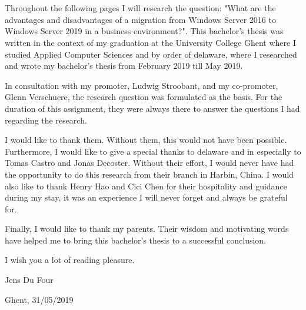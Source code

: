 
\chapter*{}
\label{ch:voorwoord}

Throughout the following pages I will research the question: "What are the advantages and disadvantages of a migration from Windows Server 2016 to Windows Server 2019 in a business environment?". 
This bachelor's thesis was written in the context of my graduation at the University College Ghent where I studied Applied Computer Sciences and by order of delaware, where I researched and wrote my bachelor's thesis from February 2019 till May 2019.

In consultation with my promoter, Ludwig Stroobant, and my co-promoter, Glenn Verschuere, the research question was formulated as the basis. 
For the duration of this assignment, they were always there to answer the questions I had regarding the research. 

I would like to thank them. 
Without them, this would not have been possible.
Furthermore, I would like to give a special thanks to delaware and in especially to Tomas Castro and Jonas Decoster. 
Without their effort, I would never have had the opportunity to do this research from their branch in Harbin, China.
I would also like to thank Henry Hao and Cici Chen for their hospitality and guidance during my stay, it was an experience I will never forget and always be grateful for. 

Finally, I would like to thank my parents. Their wisdom and motivating words have helped me to bring this bachelor's thesis to a successful conclusion.

I wish you a lot of reading pleasure.

Jens Du Four

Ghent, 31/05/2019